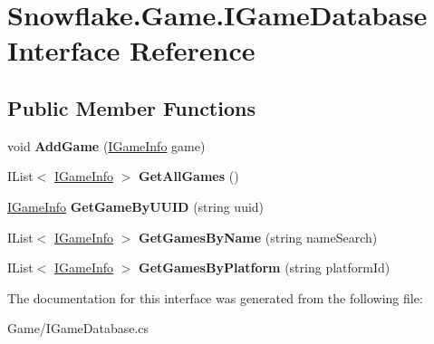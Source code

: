 \hypertarget{interface_snowflake_1_1_game_1_1_i_game_database}{}\section{Snowflake.\+Game.\+I\+Game\+Database Interface Reference}
\label{interface_snowflake_1_1_game_1_1_i_game_database}
\subsection*{Public Member Functions}
\begin{DoxyCompactItemize}
\item 
\hypertarget{interface_snowflake_1_1_game_1_1_i_game_database_ac3df9a6fa7133f65296dfc500d545083}{}void {\bfseries Add\+Game} (\hyperlink{interface_snowflake_1_1_game_1_1_i_game_info}{I\+Game\+Info} game)\label{interface_snowflake_1_1_game_1_1_i_game_database_ac3df9a6fa7133f65296dfc500d545083}

\item 
\hypertarget{interface_snowflake_1_1_game_1_1_i_game_database_a3584894d7c51710b8f0798ea2c37627e}{}I\+List$<$ \hyperlink{interface_snowflake_1_1_game_1_1_i_game_info}{I\+Game\+Info} $>$ {\bfseries Get\+All\+Games} ()\label{interface_snowflake_1_1_game_1_1_i_game_database_a3584894d7c51710b8f0798ea2c37627e}

\item 
\hypertarget{interface_snowflake_1_1_game_1_1_i_game_database_aef05226f448d26158878e2b3e9174600}{}\hyperlink{interface_snowflake_1_1_game_1_1_i_game_info}{I\+Game\+Info} {\bfseries Get\+Game\+By\+U\+U\+I\+D} (string uuid)\label{interface_snowflake_1_1_game_1_1_i_game_database_aef05226f448d26158878e2b3e9174600}

\item 
\hypertarget{interface_snowflake_1_1_game_1_1_i_game_database_a020cfc0c7185c730e072bb2488871c6f}{}I\+List$<$ \hyperlink{interface_snowflake_1_1_game_1_1_i_game_info}{I\+Game\+Info} $>$ {\bfseries Get\+Games\+By\+Name} (string name\+Search)\label{interface_snowflake_1_1_game_1_1_i_game_database_a020cfc0c7185c730e072bb2488871c6f}

\item 
\hypertarget{interface_snowflake_1_1_game_1_1_i_game_database_a8be96dda13fe81e23d35dbb0e50a36e0}{}I\+List$<$ \hyperlink{interface_snowflake_1_1_game_1_1_i_game_info}{I\+Game\+Info} $>$ {\bfseries Get\+Games\+By\+Platform} (string platform\+Id)\label{interface_snowflake_1_1_game_1_1_i_game_database_a8be96dda13fe81e23d35dbb0e50a36e0}

\end{DoxyCompactItemize}


The documentation for this interface was generated from the following file\+:\begin{DoxyCompactItemize}
\item 
Game/I\+Game\+Database.\+cs\end{DoxyCompactItemize}
